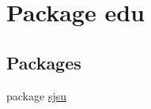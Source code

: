 \hypertarget{namespaceedu}{}\section{Package edu}
\label{namespaceedu}
\subsection*{Packages}
\begin{DoxyCompactItemize}
\item 
package \hyperlink{namespaceedu_1_1sjsu}{sjsu}
\end{DoxyCompactItemize}
